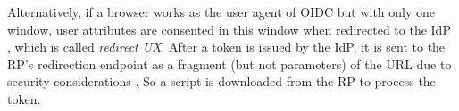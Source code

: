 
Alternatively, if a browser works as the user agent of OIDC but with only one window,
        user attributes are consented in this window when redirected to the IdP \cite{OpenIDConnect,rfc6749,GoogleIdIntegrate}, 
        which is called \emph{redirect UX}.
After a token is issued by the IdP,
    it is sent to the RP's redirection endpoint as a fragment (but not parameters) of the URL due to security considerations \cite{de2014oauth}.
So a script is downloaded from the RP to process the token.

\begin{table*}[tb]
    \caption{Privacy-preserving solutions of SSO and identity federation}
\end{table*}
